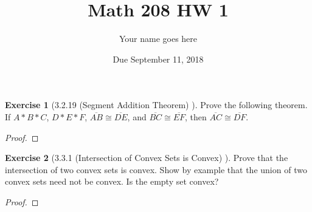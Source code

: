 \documentclass[12pt]{article}		%
\title{Math 208 HW 1}
\author{Your name goes here}
\date{Due September 11, 2018}
\theoremstyle{definition}
\newtheorem*{ex}{Exercise}
\newcommand{\seg}[1]{\overline{#1}}
\begin{document}
	\maketitle
	
	
		\begin{ex}[3.2.19 (Segment Addition Theorem) ]
		Prove the following theorem.  If $A * B * C$, $D * E *F$, $\seg{AB} \cong \seg{DE}$, and $\seg{BC} \cong \seg{EF}$, then $\seg{AC} \cong \seg{DF}$.
	\end{ex}
	
	\begin{proof} 
		
	\end{proof}

\vspace{.25in}
	
	\begin{ex}[3.3.1 (Intersection of Convex Sets is Convex) ]
		Prove that the intersection of two convex sets is convex.  Show by example that the union of two convex sets need not be convex.  Is the empty set convex?
	\end{ex}
	
	\begin{proof} 
		
	\end{proof}
	
	
	
	
\end{document}
